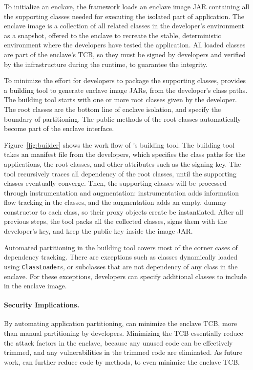 
To initialize an enclave, the \sysname{} framework
loads an enclave image JAR containing all the supporting classes needed
for executing the isolated part of application.
The enclave image is a collection of all related classes in the developer's
environment as a snapshot, offered to the enclave
to recreate the stable, deterministic environment where the
developers have tested the application.
All loaded classes are part of the enclave's TCB,
so they must be signed by developers and verified by the infrastructure
during the runtime, to guarantee the integrity.

To minimize the effort for developers to package the supporting classes,
\sysname{} provides a building tool
to generate enclave image JARs,
from the developer's class paths.
The building tool
starts with one or more root classes given by the developer.
The root classes are the bottom line of enclave isolation,
and specify the boundary of partitioning.
The public methods of the root classes automatically
become part of the enclave interface.


Figure~\ref{fig:builder} shows the work flow of \sysname{}'s building tool.
The building tool takes an manifest file from the developers,
which specifies the class paths for the applications,
the root classes, and other attributes such as the signing key.
The tool recursively traces all dependency of the root classes,
until the supporting classes eventually converge.
Then, the supporting classes will be processed through
instrumentation and augmentation:
instrumentation adds information flow tracking in the classes,
and the augmentation adds an empty, dummy constructor to each class,
so their proxy objects create be instantiated.
After all previous steps, the tool packs all the collected classes,
signs them with the developer's key, and keep the public key
inside the image JAR. 

Automated partitioning in the \sysname{} building tool
covers most of the corner cases of dependency tracking.
There are exceptions such as
classes dynamically loaded using {\tt ClassLoader}s,
or subclasses that are not dependency of any class in the enclave.
For these exceptions,
developers can specify additional classes to include in the enclave image.

\paragraph{Security Implications.}
By automating application partitioning,
\sysname{} can minimize the enclave TCB, more than
manual partitioning by developers.
Minimizing the TCB essentially reduce the attack factors in the enclave,
because any unused code can be effectively trimmed,
and any vulnerabilities in the trimmed code are eliminated.
As future work, \sysname{} can further reduce code by methods,
to even minimize the enclave TCB.


